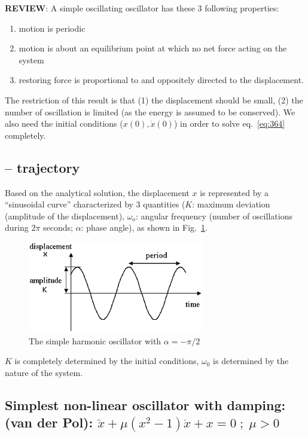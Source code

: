 {\bf REVIEW}: A simple oscillating oscillator has these 3 following
properties:
\begin{enumerate}
\item motion is periodic
\item motion is about an equilibrium point at which no net force
  acting on the system
\item restoring force is proportional to and oppositely directed to
  the displacement. 
\end{enumerate}

The restriction of this result is that (1) the displacement should be
small, (2) the number of oscillation is limited (as the energy is
assumed to be conserved). We also need the initial conditions
($x(0),\dot{x}(0)$) in order to solve eq.~\eqref{eq:364} completely.

\subsection{-- trajectory}

Based on the analytical solution, the displacement $x$ is represented
by a ``sinusoidal curve'' characterized by 3 quantities ($K$: maximum
deviation (amplitude of the displacement), $\omega_o$: angular
frequency (number of oscillations during $2\pi$ seconds; $\alpha$:
phase angle), as shown in Fig.~\ref{fig:sinusoidal_curve}.

\begin{figure}[hbt]
 \centerline{\includegraphics[height=4cm]{./images/sinusoidal_curve.eps}}
\caption{The simple harmonic oscillator with $\alpha=-\pi/2$}
\label{fig:sinusoidal_curve}
\end{figure}

$K$ is completely determined by the initial conditions, $\omega_0$ is
determined by the nature of the system. 

\subsection[Simplest non-linear oscillator with damping: (van der Pol)]{Simplest
non-linear oscillator with damping: (van der Pol):
$ \ddot{x} + \mu (x^2-1) \dot{x} + x = 0\; ; \; \mu>0$}
\label{sec:simplest-nonlinear-oscill}
\label{sec:van-der-Pol-equation}

